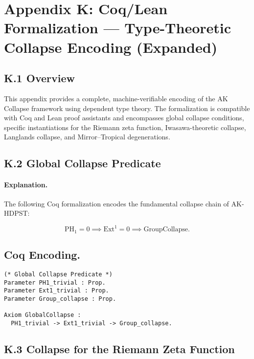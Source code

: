 \documentclass[11pt]{article}
\begin{document}
\section*{Appendix K: Coq/Lean Formalization — Type-Theoretic Collapse Encoding (Expanded)}

\subsection*{K.1 Overview}

This appendix provides a complete, machine-verifiable encoding of the AK Collapse framework using dependent type theory. The formalization is compatible with Coq and Lean proof assistants and encompasses global collapse conditions, specific instantiations for the Riemann zeta function, Iwasawa-theoretic collapse, Langlands collapse, and Mirror–Tropical degenerations.

\subsection*{K.2 Global Collapse Predicate}

\paragraph{Explanation.}  
The following Coq formalization encodes the fundamental collapse chain of AK-HDPST:

\[
\mathrm{PH}_1 = 0 \implies \mathrm{Ext}^1 = 0 \implies \mathrm{GroupCollapse}.
\]

\subsection*{Coq Encoding.}

\begin{lstlisting}[language=Coq, caption=Coq Encoding.]
(* Global Collapse Predicate *)
Parameter PH1_trivial : Prop.
Parameter Ext1_trivial : Prop.
Parameter Group_collapse : Prop.

Axiom GlobalCollapse :
  PH1_trivial -> Ext1_trivial -> Group_collapse.
\end{lstlisting}

\subsection*{K.3 Collapse for the Riemann Zeta Function}
\end{document}
